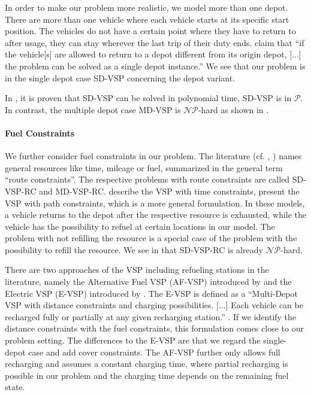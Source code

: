 In order to make our problem more realistic, we model more than one depot. There are more than one vehicle where each vehicle starts at its specific start position. The vehicles do not have a certain point where they have to return to after usage, \ie they can stay wherever the last trip of their duty ends. \cite{Daduna_Paixao} claim that \enquote{if the vehicle[s] are allowed to return to a depot different from its origin depot, [...] the problem can be solved as a single depot instance.} We see that our problem is in the single depot case SD-VSP concerning the depot variant.

In \cite{Dantzig_Fulkerson}, it is proven that SD-VSP can be solved in polynomial time, \ie SD-VSP is in $\mathcal{P}$. In contrast, the multiple depot case MD-VSP is $\mathcal{NP}$-hard as shown in \cite{Bertossi_Carraresi}.

\paragraph{Fuel Constraints} \parfill

We further consider fuel constraints in our problem. The literature (cf. \cite{Bunte_Kliewer}, \cite{Raff}) names general resources like time, mileage or fuel, summarized in the general term \enquote{route constraints}. The respective problems with route constraints are called SD-VSP-RC and MD-VSP-RC. \cite{Freling_Paixao} describe  the VSP with time constraints, \cite{Raff} present the VSP with path constraints, which is a more general formulation. In these models, a vehicle returns to the depot after the respective resource is exhausted, while the vehicle has the possibility to refuel at certain locations in our model. The problem with not refilling the resource is a special case of the problem with the possibility to refill the resource. We see in  that SD-VSP-RC is already $\mathcal{NP}$-hard.

There are two approaches of the VSP including refueling stations in the literature, namely the Alternative Fuel VSP (AF-VSP) introduced by \cite{Adler} and the Electric VSP (E-VSP) introduced by \cite{Wen}. The E-VSP is defined as a \enquote{Multi-Depot VSP with distance constraints and charging possibilities. [...] Each vehicle can be recharged fully or partially at any given recharging station.} \cite[p.~73]{Wen}. If we identify the distance constraints with the fuel constraints, this formulation comes close to our problem setting. The differences to the E-VSP are that we regard the single-depot case and add cover constraints. The AF-VSP further only allows full recharging and assumes a constant charging time, where partial recharging is possible in our problem and the charging time depends on the remaining fuel state.

